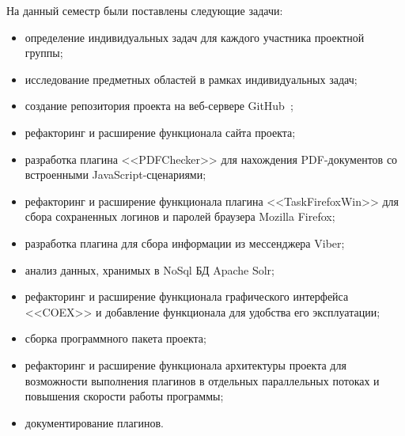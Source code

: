 На данный семестр были поставлены следующие задачи:

\begin{itemize}
  \item определение индивидуальных задач для каждого участника проектной группы;
  \item исследование предметных областей в рамках индивидуальных задач; 
  \item создание репозитория проекта на веб-сервере GitHub~\cite{github};
  \item рефакторинг и расширение функционала сайта проекта;
  \item разработка плагина <<PDFChecker>> для нахождения PDF-документов со встроенными JavaScript-сценариями;
  \item рефакторинг и расширение функционала плагина <<TaskFirefoxWin>> для сбора сохраненных логинов и паролей браузера Mozilla Firefox;
  \item разработка плагина для сбора информации из мессенджера Viber;
  \item анализ данных, хранимых в NoSql БД Apache Solr;
  \item рефакторинг и расширение функционала графического интерфейса <<COEX>> и добавление функционала для удобства его эксплуатации;
  \item сборка программного пакета проекта;  
  \item рефакторинг и расширение функционала архитектуры проекта для возможности выполнения плагинов в отдельных параллельных потоках и повышения скорости работы программы;
  \item документирование плагинов.
\end{itemize}
